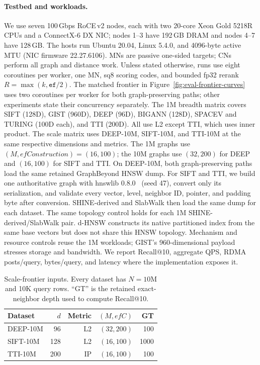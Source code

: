 \documentclass[sigconf,nonacm]{acmart}
\newcommand{\sys}{SlabWalk}
\newcommand{\cn}{CN}
\newcommand{\mn}{MN}
\newcommand{\ef}{\texttt{ef}}
\begin{document}
\paragraph{Testbed and workloads.}
We use seven 100\,Gbps RoCE\,v2 nodes, each with two 20-core Xeon Gold 5218R
CPUs and a ConnectX-6 DX NIC; nodes 1--3 have 192\,GB DRAM and nodes 4--7
have 128\,GB\@.  The hosts run Ubuntu 20.04, Linux 5.4.0, and 4096-byte active
MTU (NIC firmware 22.27.6106).  \mn{}s are passive
one-sided targets; \cn{}s perform all graph and distance work.  Unless stated
otherwise, runs use eight coroutines per worker, one \mn{}, sq8 scoring codes,
and bounded fp32 rerank $R{=}\max(k,\ef/2)$.  The matched frontier in
Figure~\ref{fig:eval-frontier-curves} uses two coroutines per worker for both
graph-preserving paths; other experiments state their concurrency separately.
The 1M breadth matrix covers SIFT (128D), GIST (960D), DEEP (96D), BIGANN
(128D), SPACEV and TURING (100D each), and TTI (200D).
All use L2 except TTI, which uses inner product.  The scale matrix uses
DEEP-10M, SIFT-10M, and TTI-10M at the same respective dimensions and metrics.
The 1M graphs use $(M,\mathit{efConstruction})=(16,100)$; the 10M graphs use
$(32,200)$ for DEEP and $(16,100)$ for SIFT and TTI\@.  On DEEP-10M, both graph-preserving paths load the same retained
GraphBeyond HNSW dump.  For SIFT and TTI, we build one authoritative graph with
hnswlib 0.8.0~\cite{hnswlib} (seed 47), convert only its serialization, and
validate every vector, level, neighbor ID, pointer, and padding byte after
conversion.  SHINE-derived and \sys{} then load the same dump for each
dataset.  The same topology control holds for each 1M SHINE-derived/\sys{}
pair.  d-HNSW constructs its native partitioned index from the same base
vectors but does not share this HNSW topology.  Mechanism and resource controls
reuse the 1M workloads; GIST's 960-dimensional payload stresses storage and
bandwidth.  We report Recall@10, aggregate QPS, RDMA posts/query, bytes/query,
and latency where the implementation exposes it.

\begin{table}[t]
\centering\scriptsize
\caption{Scale-frontier inputs.  Every dataset has $N{=}10$M and 10K query
rows.  ``GT'' is the retained exact-neighbor depth used to compute Recall@10.}
\label{tab:frontier-inputs}
\setlength{\tabcolsep}{3.2pt}
\begin{tabular}{@{}lrrrr@{}}
\toprule
Dataset & $d$ & Metric & $(M,\mathit{efC})$ & GT \\
\midrule
DEEP-10M & 96 & L2 & $(32,200)$ & 100 \\
SIFT-10M & 128 & L2 & $(16,100)$ & 1000 \\
TTI-10M & 200 & IP & $(16,100)$ & 100 \\
\bottomrule
\end{tabular}
\end{table}
\end{document}
